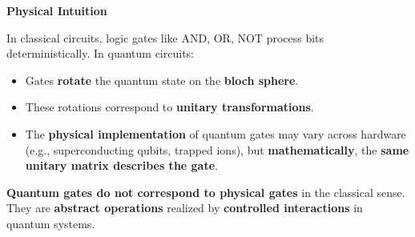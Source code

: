 \highspace
\begin{flushleft}
    \textcolor{Green3}{ \textbf{Physical Intuition}}
\end{flushleft}
In classical circuits, logic gates like AND, OR, NOT process bits deterministically. In quantum circuits:
\begin{itemize}
    \item Gates \textbf{rotate} the quantum state on the \textbf{bloch sphere}.
    \item These rotations correspond to \textbf{unitary transformations}.
    \item The \textbf{physical implementation} of quantum gates may vary across hardware (e.g., superconducting qubits, trapped ions), but \textbf{mathematically}, the \textbf{same unitary matrix describes the gate}.
\end{itemize}
\textbf{Quantum gates do not correspond to physical gates} in the classical sense. They are \textbf{abstract operations} realized by \textbf{controlled interactions} in quantum systems.
